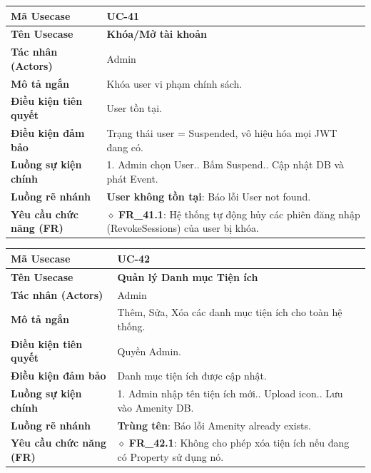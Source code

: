 \begin{table}[H]
\renewcommand{\arraystretch}{1.3}
\centering
\begin{tabularx}{\textwidth}{|p{4.5cm}|X|}
\hline
\cellcolor{gray!15}\bfseries Mã Usecase & \textbf{UC-41} \\ \hline
\cellcolor{gray!15}\bfseries Tên Usecase & \textbf{Khóa/Mở tài khoản} \\ \hline
\cellcolor{gray!15}\bfseries Tác nhân (Actors) & Admin \\ \hline
\cellcolor{gray!15}\bfseries Mô tả ngắn & Khóa user vi phạm chính sách. \\ \hline
\cellcolor{gray!15}\bfseries Điều kiện tiên quyết & User tồn tại. \\ \hline
\cellcolor{gray!15}\bfseries Điều kiện đảm bảo & Trạng thái user = Suspended, vô hiệu hóa mọi JWT đang có. \\ \hline
\cellcolor{gray!15}\bfseries Luồng sự kiện chính & 1. Admin chọn User.\newline 2. Bấm Suspend.\newline 3. Cập nhật DB và phát Event. \\ \hline
\cellcolor{gray!15}\bfseries Luồng rẽ nhánh & \textbf{User không tồn tại}: Báo lỗi User not found. \\ \hline
\cellcolor{gray!15}\bfseries Yêu cầu chức năng (FR) & $\diamond$ \textbf{FR\_41.1}: Hệ thống tự động hủy các phiên đăng nhập (RevokeSessions) của user bị khóa. \\ \hline
\end{tabularx}
\end{table}

\begin{table}[H]
\renewcommand{\arraystretch}{1.3}
\centering
\begin{tabularx}{\textwidth}{|p{4.5cm}|X|}
\hline
\cellcolor{gray!15}\bfseries Mã Usecase & \textbf{UC-42} \\ \hline
\cellcolor{gray!15}\bfseries Tên Usecase & \textbf{Quản lý Danh mục Tiện ích} \\ \hline
\cellcolor{gray!15}\bfseries Tác nhân (Actors) & Admin \\ \hline
\cellcolor{gray!15}\bfseries Mô tả ngắn & Thêm, Sửa, Xóa các danh mục tiện ích cho toàn hệ thống. \\ \hline
\cellcolor{gray!15}\bfseries Điều kiện tiên quyết & Quyền Admin. \\ \hline
\cellcolor{gray!15}\bfseries Điều kiện đảm bảo & Danh mục tiện ích được cập nhật. \\ \hline
\cellcolor{gray!15}\bfseries Luồng sự kiện chính & 1. Admin nhập tên tiện ích mới.\newline 2. Upload icon.\newline 3. Lưu vào Amenity DB. \\ \hline
\cellcolor{gray!15}\bfseries Luồng rẽ nhánh & \textbf{Trùng tên}: Báo lỗi Amenity already exists. \\ \hline
\cellcolor{gray!15}\bfseries Yêu cầu chức năng (FR) & $\diamond$ \textbf{FR\_42.1}: Không cho phép xóa tiện ích nếu đang có Property sử dụng nó. \\ \hline
\end{tabularx}
\end{table}

